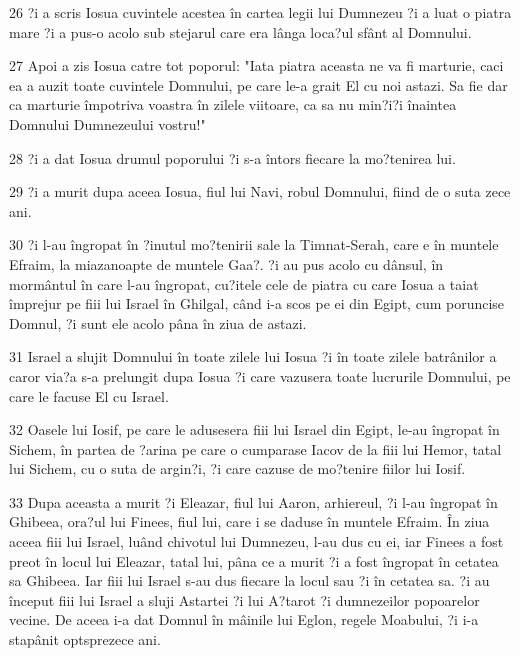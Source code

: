 \par 26 ?i a scris Iosua cuvintele acestea în cartea legii lui Dumnezeu ?i a luat o piatra mare ?i a pus-o acolo sub stejarul care era lânga loca?ul sfânt al Domnului.
\par 27 Apoi a zis Iosua catre tot poporul: "Iata piatra aceasta ne va fi marturie, caci ea a auzit toate cuvintele Domnului, pe care le-a grait El cu noi astazi. Sa fie dar ca marturie împotriva voastra în zilele viitoare, ca sa nu min?i?i înaintea Domnului Dumnezeului vostru!"
\par 28 ?i a dat Iosua drumul poporului ?i s-a întors fiecare la mo?tenirea lui.
\par 29 ?i a murit dupa aceea Iosua, fiul lui Navi, robul Domnului, fiind de o suta zece ani.
\par 30 ?i l-au îngropat în ?inutul mo?tenirii sale la Timnat-Serah, care e în muntele Efraim, la miazanoapte de muntele Gaa?. ?i au pus acolo cu dânsul, în mormântul în care l-au îngropat, cu?itele cele de piatra cu care Iosua a taiat împrejur pe fiii lui Israel în Ghilgal, când i-a scos pe ei din Egipt, cum poruncise Domnul, ?i sunt ele acolo pâna în ziua de astazi.
\par 31 Israel a slujit Domnului în toate zilele lui Iosua ?i în toate zilele batrânilor a caror via?a s-a prelungit dupa Iosua ?i care vazusera toate lucrurile Domnului, pe care le facuse El cu Israel.
\par 32 Oasele lui Iosif, pe care le adusesera fiii lui Israel din Egipt, le-au îngropat în Sichem, în partea de ?arina pe care o cumparase Iacov de la fiii lui Hemor, tatal lui Sichem, cu o suta de argin?i, ?i care cazuse de mo?tenire fiilor lui Iosif.
\par 33 Dupa aceasta a murit ?i Eleazar, fiul lui Aaron, arhiereul, ?i l-au îngropat în Ghibeea, ora?ul lui Finees, fiul lui, care i se daduse în muntele Efraim. În ziua aceea fiii lui Israel, luând chivotul lui Dumnezeu, l-au dus cu ei, iar Finees a fost preot în locul lui Eleazar, tatal lui, pâna ce a murit ?i a fost îngropat în cetatea sa Ghibeea. Iar fiii lui Israel s-au dus fiecare la locul sau ?i în cetatea sa. ?i au început fiii lui Israel a sluji Astartei ?i lui A?tarot ?i dumnezeilor popoarelor vecine. De aceea i-a dat Domnul în mâinile lui Eglon, regele Moabului, ?i i-a stapânit optsprezece ani.


